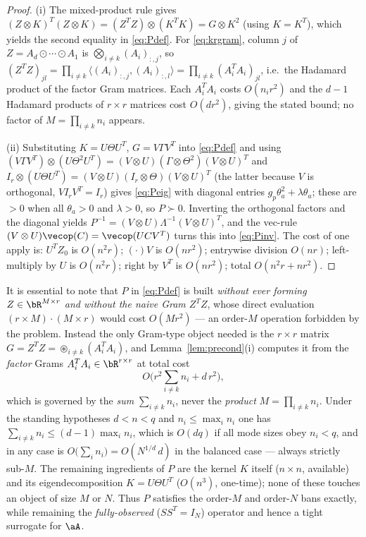 \begin{proof}
(i) The mixed-product rule gives
$(Z\otimes K)^{T}(Z\otimes K)=(Z^{T}Z)\otimes(K^{T}K)=G\otimes K^{2}$ (using
$K=K^{T}$), which yields the second equality in \eqref{eq:Pdef}. For
\eqref{eq:krgram}, column $j$ of $Z=A_d\odot\cdots\odot A_1$ is
$\bigotimes_{i\neq k}(A_i)_{:,j}$, so
$(Z^{T}Z)_{jl}=\prod_{i\neq k}\langle (A_i)_{:,j},(A_i)_{:,l}\rangle
=\prod_{i\neq k}(A_i^{T}A_i)_{jl}$, i.e.\ the Hadamard product of the factor
Gram matrices. Each $A_i^{T}A_i$ costs $O(n_i r^{2})$ and the $d-1$ Hadamard
products of $r\times r$ matrices cost $O(d r^{2})$, giving the stated bound; no
factor of $M=\prod_{i\neq k}n_i$ appears.

(ii) Substituting $K=U\Theta U^{T}$, $G=V\Gamma V^{T}$ into \eqref{eq:Pdef} and
using $(V\Gamma V^{T})\otimes(U\Theta^{2}U^{T})=(V\otimes U)(\Gamma\otimes\Theta^{2})(V\otimes U)^{T}$
and $I_r\otimes(U\Theta U^{T})=(V\otimes U)(I_r\otimes\Theta)(V\otimes U)^{T}$
(the latter because $V$ is orthogonal, $V I_r V^{T}=I_r$) gives \eqref{eq:Peig}
with diagonal entries $g_p\theta_a^{2}+\lambda\theta_a$; these are $>0$ when all
$\theta_a>0$ and $\lambda>0$, so $P\succ0$. Inverting the orthogonal factors and
the diagonal yields
$P^{-1}=(V\otimes U)\Lambda^{-1}(V\otimes U)^{T}$, and the vec-rule
$(V\otimes U)\vecop(C)=\vecop(UCV^{T})$ turns this into \eqref{eq:Pinv}.
The cost of one apply is: $U^{T}Z_0$ is $O(n^{2}r)$; $(\cdot)V$ is $O(nr^{2})$;
entrywise division $O(nr)$; left-multiply by $U$ is $O(n^{2}r)$; right by
$V^{T}$ is $O(nr^{2})$; total $O(n^{2}r+nr^{2})$.
\end{proof}

\begin{remark}\label{rem:noM}
It is essential to note that $P$ in \eqref{eq:Pdef} is built \emph{without ever
forming $Z\in\bR^{M\times r}$ and without the naive Gram
$Z^{T}Z$}, whose direct evaluation $(r\times M)\cdot(M\times r)$ would cost
$O(Mr^{2})$ --- an order-$M$ operation forbidden by the problem. Instead the
only Gram-type object needed is the $r\times r$ matrix
$G=Z^{T}Z=\circledast_{i\neq k}(A_i^{T}A_i)$, and Lemma~\ref{lem:precond}(i)
computes it from the \emph{factor} Grams $A_i^{T}A_i\in\bR^{r\times r}$ at total
cost
\[
  O\!\Big(r^{2}\sum_{i\neq k}n_i+d\,r^{2}\Big),
\]
which is governed by the \emph{sum} $\sum_{i\neq k}n_i$, never the
\emph{product} $M=\prod_{i\neq k}n_i$. Under the standing hypotheses
$d<n<q$ and $n_i\le\max_i n_i$ one has $\sum_{i\neq k}n_i\le(d-1)\max_i n_i$,
which is $O(dq)$ if all mode sizes obey $n_i<q$, and in any case is
$O\!\big(\sum_i n_i\big)=O(N^{1/d}\,d)$ in the balanced case --- always strictly
sub-$M$. The remaining ingredients of $P$ are the kernel $K$ itself
($n\times n$, available) and its eigendecomposition $K=U\Theta U^{T}$
($O(n^{3})$, one-time); none of these touches an object of size $M$ or $N$.
Thus $P$ satisfies the order-$M$ and order-$N$ bans exactly, while remaining the
\emph{fully-observed} ($SS^{T}=I_N$) operator and hence a tight surrogate for
$\aA$.
\end{remark}

